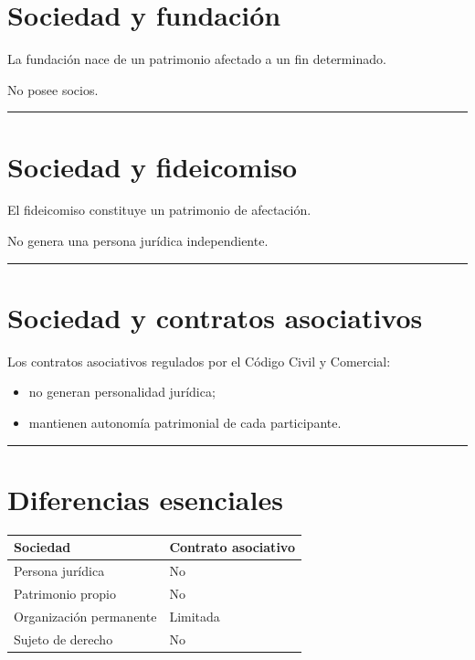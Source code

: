 \documentclass[
  spanish,
  letterpaper,
  DIV=11,
  numbers=noendperiod]{scrartcl}
\newcounter{none} %
\providecommand{\tightlist}{%
  \setlength{\itemsep}{0pt}\setlength{\parskip}{0pt}}
\begin{document}
\section{Sociedad y fundación}\label{sociedad-y-fundaciuxf3n-1}

La fundación nace de un patrimonio afectado a un fin determinado.

No posee socios.

\begin{center}\rule{0.5\linewidth}{0.5pt}\end{center}

\section{Sociedad y fideicomiso}\label{sociedad-y-fideicomiso}

El fideicomiso constituye un patrimonio de afectación.

No genera una persona jurídica independiente.

\begin{center}\rule{0.5\linewidth}{0.5pt}\end{center}

\section{Sociedad y contratos
asociativos}\label{sociedad-y-contratos-asociativos}

Los contratos asociativos regulados por el Código Civil y Comercial:

\begin{itemize}
\tightlist
\item
  no generan personalidad jurídica;
\item
  mantienen autonomía patrimonial de cada participante.
\end{itemize}

\begin{center}\rule{0.5\linewidth}{0.5pt}\end{center}

\section{Diferencias esenciales}\label{diferencias-esenciales}

{\def\LTcaptype{none} %
\begin{longtable}[]{@{}ll@{}}
\toprule\noalign{}
Sociedad & Contrato asociativo \\
\midrule\noalign{}
\endhead
\bottomrule\noalign{}
\endlastfoot
Persona jurídica & No \\
Patrimonio propio & No \\
Organización permanente & Limitada \\
Sujeto de derecho & No \\
\end{longtable}
}
\end{document}
